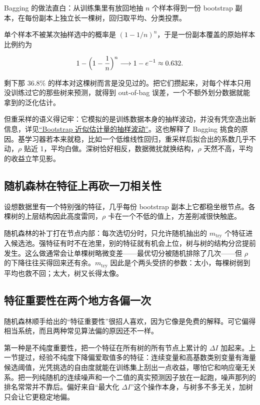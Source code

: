 Bagging 的做法直白：从训练集里有放回地抽 \(n\) 个样本得到一份 bootstrap 副本，在每份副本上独立长一棵树，回归取平均、分类投票。

单个样本不被某次抽样选中的概率是 \((1-1/n)^n\)，于是一份副本覆盖的原始样本比例约为

\[
1-\Bigl(1-\frac1n\Bigr)^{n}\longrightarrow 1-e^{-1}\approx 0.632 .
\]

剩下那 36.8\% 的样本对这棵树而言是没见过的。把它们攒起来，对每个样本只用没训练过它的那些树来预测，就得到 out-of-bag 误差，一个不额外划分数据就能拿到的泛化估计。

但重采样的语义得记牢：它模拟的是训练数据本身的抽样波动，并没有凭空造出新信息，详见\hyperref[sec:11-Mathematical-Statistics/06-Resampling-and-Model-Selection/01]{``Bootstrap 近似估计量的抽样波动''}。这也解释了 Bagging 挑食的原因。基学习器若本来就稳，比如一个低维线性回归，重采样后拟合出的系数几乎不动，\(\rho\) 贴近 1，平均白做。深树恰好相反，数据微扰就换结构，\(\rho\) 天然不高，平均的收益立竿见影。

\subsection{随机森林在特征上再砍一刀相关性}

设想数据里有一个特别强的特征，几乎每份 bootstrap 副本上它都稳坐根节点。各棵树的上层结构因此高度雷同，\(\rho\) 卡在一个不低的值上，方差削减很快触底。

随机森林的补丁打在节点内部：每次选切分时，只允许随机抽出的 \(m_{\text{try}}\) 个特征进入候选池。强特征有时不在池里，别的特征就有机会上位，树与树的结构分岔提前发生。这么做通常会让单棵树略微变差——最优切分被随机排除了几次——但 \(\rho\) 的下降往往买得回来还有余。\(m_{\text{try}}\) 因此是个两头受挤的参数：太小，每棵树弱到平均也救不回；太大，树又长得太像。

\subsection{特征重要性在两个地方各偏一次}

随机森林顺手给出的``特征重要性''很招人喜欢，因为它像是免费的解释。可它偏得相当系统，而且两种常见算法偏的原因还不一样。

第一种是不纯度重要性，把一个特征在所有树的所有节点上累计的 \(\Delta I\) 加起来。上一节提过，经验不纯度下降偏爱取值多的特征：连续变量和高基数类别变量有海量候选阈值，光凭挑选的自由度就能在训练集上刮出一点收益，哪怕它和响应毫无关系。把一列纯随机的连续噪声和一个二值的真实预测因子放在一起跑，噪声那列的排名常常并不靠后。偏好来自``最大化 \(\Delta I\)''这个操作本身，与树多不多无关，加树只会让它更稳定地偏。

